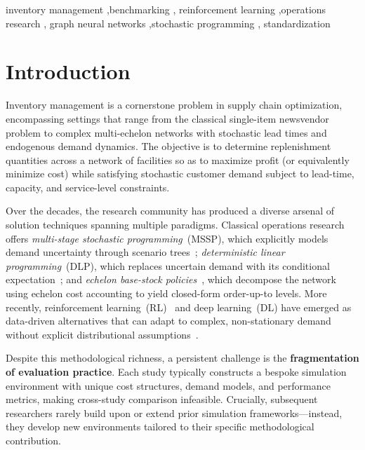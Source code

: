 \documentclass[preprint,12pt]{elsarticle}
\begin{document}
\begin{frontmatter}
\begin{keyword}
inventory management \sep benchmarking \sep
reinforcement learning \sep operations research \sep
graph neural networks \sep stochastic programming \sep
standardization
\end{keyword}

\end{frontmatter}

\section{Introduction}\label{sec:intro}

Inventory management is a cornerstone problem in supply chain optimization,
encompassing settings that range from the classical single-item newsvendor
problem to complex multi-echelon networks with stochastic lead times and
endogenous demand dynamics. The objective is to determine replenishment
quantities across a network of facilities so as to maximize profit (or
equivalently minimize cost) while satisfying stochastic customer demand
subject to lead-time, capacity, and service-level constraints.

Over the decades, the research community has produced a diverse arsenal of
solution techniques spanning multiple paradigms. Classical operations
research offers \emph{multi-stage stochastic programming}~(MSSP), which
explicitly models demand uncertainty through scenario
trees~\citep{birge2011introduction}; \emph{deterministic linear
programming}~(DLP), which replaces uncertain demand with its conditional
expectation~\citep{brown2010information}; and \emph{echelon base-stock
policies}~\citep{clark1960optimal}, which decompose the network using
echelon cost accounting to yield closed-form order-up-to levels. More
recently, reinforcement learning~(RL)~\citep{schulman2017proximal} and
deep learning~(DL) have emerged as data-driven alternatives that can adapt
to complex, non-stationary demand without explicit distributional
assumptions~\citep{oroojlooyjadid2022deep, gijsbrechts2022can,
devalve2023understanding}.

Despite this methodological richness, a persistent challenge is the
\textbf{fragmentation of evaluation practice}. Each study typically
constructs a bespoke simulation environment with unique cost structures,
demand models, and performance metrics, making cross-study comparison
infeasible. Crucially, subsequent researchers rarely build upon or extend
prior simulation frameworks---instead, they develop new environments
tailored to their specific methodological contribution.
\end{document}
